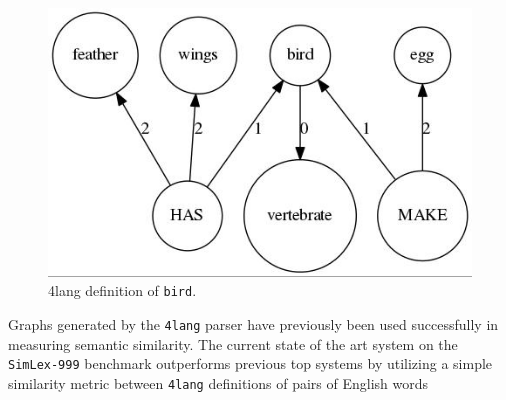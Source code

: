 \begin{figure}
	\centering
	\includegraphics[scale=0.5]{figures/bird}
	\caption{4lang definition of \texttt{bird}.}
	\label{fig:bird}
\end{figure}

Graphs generated by the \texttt{4lang} parser have previously been used
successfully in measuring semantic similarity. The current state of the
art system on the \texttt{SimLex-999} benchmark \cite{Hill:2014a}
outperforms previous top systems by utilizing a simple similarity metric
between \texttt{4lang} definitions of pairs of English words
\cite{Recski:2016c}
